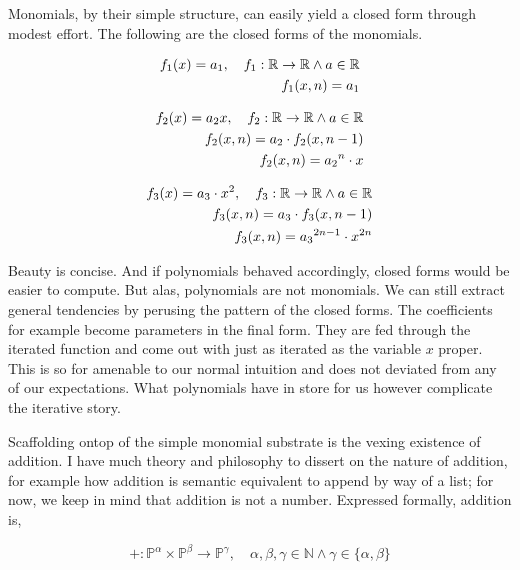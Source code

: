 Monomials, by their simple structure, can easily yield a closed form through
modest effort. The following are the closed forms of the monomials.

\begin{align}
    f_1(x) = a_1, \quad f_1: \mathbb{R} \rightarrow \mathbb{R} \land a \in \mathbb{R} \notag \\
    f_1(x,n) = a_1
\end{align}

\begin{align}
    f_2(x) = a_2x, \quad f_2: \mathbb{R} \rightarrow \mathbb{R} \land a \in \mathbb{R} \notag \\
    f_2(x,n) = a_2 \cdot f_2(x,n-1) \notag                                                    \\
    f_2(x,n) = {a_2}^{n} \cdot x
\end{align}

\begin{align}
    f_3(x) = a_3 \cdot x^2, \quad f_3: \mathbb{R} \rightarrow \mathbb{R} \land a \in \mathbb{R} \notag \\
    f_3(x,n) = a_3 \cdot f_3(x,n-1) \notag                                                             \\
    f_3(x,n) = {a_3}^{2n - 1} \cdot x^{2n}
\end{align}

Beauty is concise. And if polynomials behaved accordingly, closed forms would
be easier to compute. But alas, polynomials are not monomials. We can still
extract general tendencies by perusing the pattern of the closed forms. The
coefficients for example become parameters in the final form. They are fed
through the iterated function and come out with just as iterated as the
variable $x$ proper. This is so for amenable to our normal intuition and does
not deviated from any of our expectations. What polynomials have in store for
us however complicate the iterative story.

Scaffolding ontop of the simple monomial substrate is the vexing existence of
addition. I have much theory and philosophy to dissert on the nature of
addition, for example how addition is semantic equivalent to append by way of a
list; for now, we keep in mind that addition is not a number. Expressed
formally, addition is,

\begin{equation}
    +: \mathbb{P}^\alpha \times \mathbb{P}^\beta \rightarrow \mathbb{P}^\gamma, \quad \alpha, \beta, \gamma \in \mathbb{N} \land \gamma \in \{\alpha, \beta\}
\end{equation}

